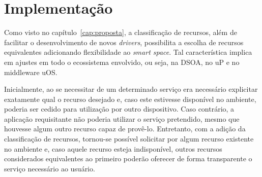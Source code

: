 \chapter{Implementação}

Como visto no capítulo~\ref{cap:proposta}, a classificação de recursos, além de facilitar o desenvolvimento de novos \emph{drivers}, possibilita a escolha de recursos equivalentes adicionando flexibilidade ao \emph{smart space}. Tal característica implica em ajustes em todo o ecossistema envolvido, ou seja, na DSOA, no uP e no middleware uOS.

Inicialmente, ao se necessitar de um determinado serviço era necessário explicitar exatamente qual o recurso desejado e, caso este estivesse disponível no ambiente, poderia ser cedido para utilização por outro dispositivo. Caso contrário, a aplicação requisitante não poderia utilizar o serviço pretendido, mesmo que houvesse algum outro recurso capaz de provê-lo. Entretanto, com a adição da classificação de recursos, tornou-se possível solicitar por algum recurso existente no ambiente e, caso aquele recurso esteja indisponível, outros recursos considerados equivalentes ao primeiro poderão oferecer de forma transparente o serviço necessário ao usuário.


